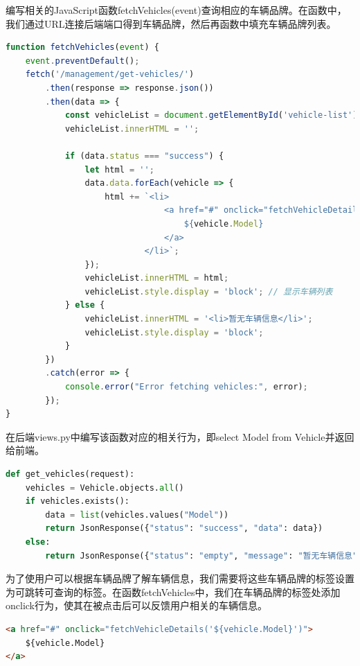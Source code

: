 \documentclass[UTF8,a4paper,12pt]{ctexart}
\begin{document}
编写相关的JavaScript函数fetchVehicles(event)查询相应的车辆品牌。在函数中，我们通过URL连接后端端口得到车辆品牌，然后再函数中填充车辆品牌列表。
\begin{lstlisting}[language=JavaScript]
function fetchVehicles(event) {
    event.preventDefault();
    fetch('/management/get-vehicles/')
        .then(response => response.json())
        .then(data => {
            const vehicleList = document.getElementById('vehicle-list');
            vehicleList.innerHTML = ''; 

            if (data.status === "success") {
                let html = '';
                data.data.forEach(vehicle => {
                    html += `<li>
                                <a href="#" onclick="fetchVehicleDetails('${vehicle.Model}')">
                                    ${vehicle.Model}
                                </a>
                            </li>`;
                });
                vehicleList.innerHTML = html;
                vehicleList.style.display = 'block'; // 显示车辆列表
            } else {
                vehicleList.innerHTML = '<li>暂无车辆信息</li>';
                vehicleList.style.display = 'block';
            }
        })
        .catch(error => {
            console.error("Error fetching vehicles:", error);
        });
}
\end{lstlisting}

在后端views.py中编写该函数对应的相关行为，即select Model from Vehicle并返回给前端。
\begin{lstlisting}[language=Python]
def get_vehicles(request):
    vehicles = Vehicle.objects.all()
    if vehicles.exists():
        data = list(vehicles.values("Model"))
        return JsonResponse({"status": "success", "data": data})
    else:
        return JsonResponse({"status": "empty", "message": "暂无车辆信息"})
\end{lstlisting}

为了使用户可以根据车辆品牌了解车辆信息，我们需要将这些车辆品牌的标签设置为可跳转可查询的标签。在函数fetchVehicles中，我们在车辆品牌的标签处添加onclick行为，使其在被点击后可以反馈用户相关的车辆信息。
\begin{lstlisting}[language=HTML]
<a href="#" onclick="fetchVehicleDetails('${vehicle.Model}')">
    ${vehicle.Model}
</a>
\end{lstlisting}
\end{document}
